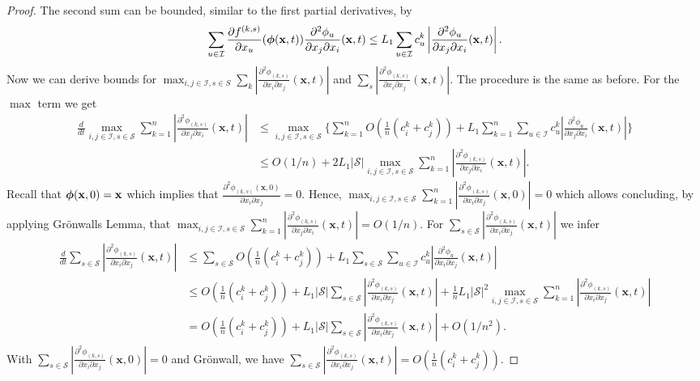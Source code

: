 \documentclass[acmsmall]{acmart}
\newcommand\bx{\mathbf{x}}
\newcommand\bphi{\text{\boldmath$\phi$}}
\newcommand\calI{\mathcal{I}}
\newcommand\calS{\mathcal{S}}
\newcommand\abs[1]{\left|#1\right|}         %
\newcommand{\dd}[3]{ \frac{\partial^2 #1 }{ \partial x_{#2} \partial x_{#3}}}
\begin{document}
\begin{proof}
The second sum can be bounded, similar to the first partial derivatives, by
\begin{align*}
\sum_{u \in \calI} \frac{\partial f^{(k,s)}}{\partial x_u}(\bphi (\bx,t)) \dd{\phi_u}{j}{i}(\bx,t) \leq L_{1} \sum_{u\in \calI} c_u^k\abs{\dd{\phi_{u} }{j}{i}(\bx,t)} .
\end{align*}
Now we can derive bounds for $\max_{i,j \in \calI, s\in S} \sum_k \abs{\dd{\phi_{(k,s)}}{i}{j}(\bx,t)}$ and $\sum_{s} \abs{\dd{\phi_{(k,s)}}{i}{j}(\bx,t)}$. The procedure is the same as before. For the $\max$ term we get
\begin{align*}
\frac{d}{dt}\max_{i,j\in\calI, s\in \calS} \sum_{k=1}^{n} \abs{\frac{\partial^2 \phi_{(k,s)}}{\partial x_j\partial x_i}(\bx, t) } & \leq \max_{i,j\in\calI, s\in \calS} \{\sum_{k=1}^{n} O(\frac{1}{n}(c^k_i + c^k_j)) + L_{1} \sum_{k=1}^{n}\sum_{u\in \calI} c_u^k\abs{\dd{\phi_{u} }{j}{i}(\bx,t)}\} \\
& \leq O(1/n) + 2L_{1}\abs{\calS} \max_{i,j\in\calI, s\in \calS} \sum_{k=1}^{n} \abs{\frac{\partial^2 \phi_{(k,s)}}{\partial x_j\partial x_i}(\bx, t)}.
\end{align*} 
Recall that $\bphi(\bx, 0)=\bx$ which implies that $\frac{\partial^2 \phi_{(k,s)}(\bx, 0)}{\partial x_{i}\partial x_j}=0$.  Hence, $\max_{i,j\in\calI, s\in \calS} \sum_{k=1}^{n} \abs{\frac{\partial^2 \phi_{(k,s)}}{\partial x_i\partial x_j}(\bx, 0) } = 0$ which allows concluding, by applying Grönwalls Lemma, that
$\max_{i,j\in\calI, s\in \calS} \sum_{k=1}^{n} \abs{\frac{\partial^2 \phi_{(k,s)}}{\partial x_j\partial x_i}(\bx, t) } = O(1/n)$.
For $\sum_{s\in\calS} \abs{\dd{\phi_{(k,s)}}{i}{j}(\bx,t)}$ we infer
\begin{align*}
\frac{d}{dt}\sum_{s\in\calS} \abs{\dd{\phi_{(k,s)}}{i}{j}(\bx,t)} &\leq \sum_{s\in \calS} O(\frac{1}{n}(c^k_i + c^k_j)) + L_{1} \sum_{s\in\calS}\sum_{u\in \calI} c_u^k\abs{\dd{\phi_{u} }{i}{j}(\bx,t)} \\
& \leq O(\frac{1}{n}(c^k_i + c^k_j)) + L_{1}\abs{\calS} \sum_{s\in \calS} \abs{\dd{\phi_{(k,s)}}{i}{j}(\bx,t)} + \frac{1}{n}L_{1}\abs{\calS}^2 \max_{i,j\in\calI, s\in \calS} \sum_{k=1}^{n} \abs{\frac{\partial^2 \phi_{(k,s)}}{\partial x_i\partial x_j}(\bx, t)} \\
& = O(\frac{1}{n}(c^k_i + c^k_j)) + L_{1}\abs{\calS} \sum_{s\in \calS} \abs{\dd{\phi_{(k,s)}}{i}{j}(\bx,t)} + O(1/n^2).
\end{align*}
With $\sum_{s\in\calS} \abs{\dd{\phi_{(k,s)}}{i}{j}(\bx,0)} = 0$ and Grönwall, we have $\sum_{s\in\calS} \abs{\dd{\phi_{(k,s)}}{i}{j}(\bx,t)} = O(\frac{1}{n}(c^k_i + c^k_j))$. 


\end{proof}
\end{document}

